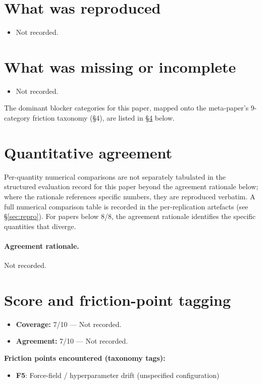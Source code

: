 \documentclass[11pt]{article}
\begin{document}
\section{What was reproduced}
\begin{itemize}
\item Not recorded.
\end{itemize}

\section{What was missing or incomplete}
\begin{itemize}
\item Not recorded.
\end{itemize}
The dominant blocker categories for this paper, mapped onto the meta-paper's 9-category friction taxonomy (\S4), are listed in \S\ref{sec:friction} below.

\section{Quantitative agreement}
Per-quantity numerical comparisons are not separately tabulated in the structured evaluation record for this paper beyond the agreement rationale below; where the rationale references specific numbers, they are reproduced verbatim. A full numerical comparison table is recorded in the per-replication artefacts (see \S\ref{sec:repro}). For papers below 8/8, the agreement rationale identifies the specific quantities that diverge.

\paragraph{Agreement rationale.} Not recorded.

\section{Score and friction-point tagging}\label{sec:friction}
\begin{itemize}
\item \textbf{Coverage:} 7/10 --- Not recorded.
\item \textbf{Agreement:} 7/10 --- Not recorded.
\end{itemize}

\noindent\textbf{Friction points encountered (taxonomy tags):}
\begin{itemize}
\item \textbf{F5}: Force-field / hyperparameter drift (unspecified configuration)
\end{itemize}
\end{document}
